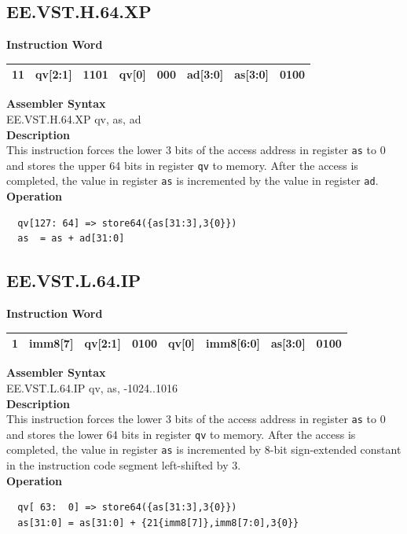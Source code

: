 \clearpage
\subsection{EE.VST.H.64.XP}\label{instruction:EEVSTH64XP}
\setlength\tabcolsep{6pt}
\textbf{Instruction Word} \\
\begin{tabular}{|c|c|c|c|c|c|c|c|}
	\hline
	11 & qv[2:1] & 1101 & qv[0] & 000 & ad[3:0] & as[3:0] & 0100 \\
	\hline
\end{tabular}

\textbf{Assembler Syntax} \\
EE.VST.H.64.XP qv, as, ad \\
\textbf{Description} \\
This instruction forces the lower 3 bits of the access address in register \lstinline{as} to 0 and stores the upper 64 bits in register \lstinline{qv} to memory. After the access is completed, the value in register \lstinline{as} is incremented by the value in register \lstinline{ad}.\\
\textbf{Operation}
\begin{lstlisting}
  qv[127: 64] => store64({as[31:3],3{0}})
  as  = as + ad[31:0]
\end{lstlisting}

\clearpage
\subsection{EE.VST.L.64.IP}\label{instruction:EEVSTL64IP}
\setlength\tabcolsep{6pt}
\textbf{Instruction Word} \\
\begin{tabular}{|c|c|c|c|c|c|c|c|}
	\hline
	1 & imm8[7] & qv[2:1] & 0100 & qv[0] & imm8[6:0] & as[3:0] & 0100 \\
	\hline
\end{tabular}

\textbf{Assembler Syntax} \\
EE.VST.L.64.IP qv, as, -1024..1016 \\
\textbf{Description} \\
This instruction forces the lower 3 bits of the access address in register \lstinline{as} to 0 and stores the lower 64 bits in register \lstinline{qv} to memory. After the access is completed, the value in register \lstinline{as} is incremented by 8-bit sign-extended constant in the instruction code segment left-shifted by 3.\\
\textbf{Operation}
\begin{lstlisting}
  qv[ 63:  0] => store64({as[31:3],3{0}})
  as[31:0] = as[31:0] + {21{imm8[7]},imm8[7:0],3{0}}
\end{lstlisting}

